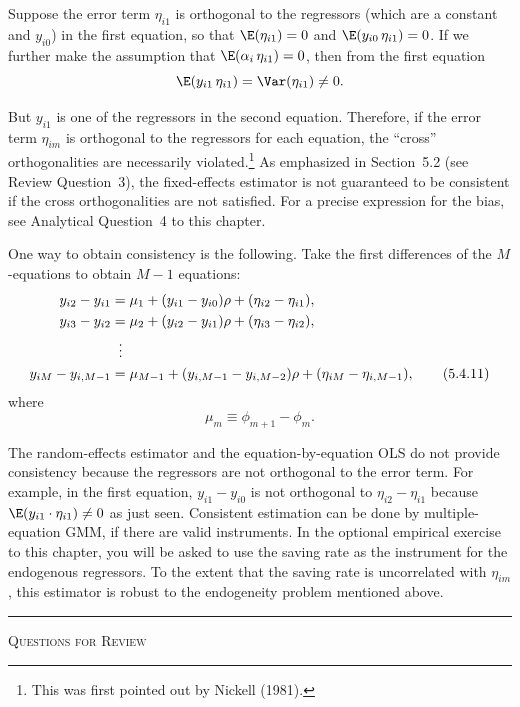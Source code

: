 Suppose the error term $\eta_{i1}$ is orthogonal to the regressors (which are a constant and
$y_{i0}$) in the first equation, so that $\E(\eta_{i1}) = 0$ and $\E(y_{i0}\,\eta_{i1}) = 0$.
If we further make
the assumption that $\E(\alpha_i\,\eta_{i1}) = 0$, then from the first equation
\[
  \E(y_{i1}\,\eta_{i1}) = \Var(\eta_{i1}) \neq 0.
\]

But $y_{i1}$ is one of the regressors in the second equation. Therefore, if the error term
$\eta_{im}$ is orthogonal to the regressors for each equation, the ``cross'' orthogonalities are
necessarily violated.\footnote{This was first pointed out by Nickell (1981).}
As emphasized in Section~5.2 (see Review Question~3), the
fixed-effects estimator is not guaranteed to be consistent if the cross orthogonalities
are not satisfied. For a precise expression for the bias, see Analytical Question~4 to
this chapter.

One way to obtain consistency is the following. Take the first differences of
the $M$-equations to obtain $M - 1$ equations:
\begin{align}
  y_{i2} - y_{i1} &= \mu_1 + (y_{i1} - y_{i0})\rho + (\eta_{i2} - \eta_{i1}),
  \notag \\
  y_{i3} - y_{i2} &= \mu_2 + (y_{i2} - y_{i1})\rho + (\eta_{i3} - \eta_{i2}),
  \notag \\
  &\;\;\vdots \notag \\
  y_{iM} - y_{i,M-1} &= \mu_{M-1} + (y_{i,M-1} - y_{i,M-2})\rho
  + (\eta_{iM} - \eta_{i,M-1}),
  \label{eq:5.4.11} \tag{5.4.11}
\end{align}
where
\[
  \mu_m \equiv \phi_{m+1} - \phi_m.
\]

The random-effects estimator and the equation-by-equation OLS do not provide
consistency because the regressors are not orthogonal to the error term. For example,
in the first equation, $y_{i1} - y_{i0}$ is not orthogonal to $\eta_{i2} - \eta_{i1}$
because $\E(y_{i1} \cdot \eta_{i1}) \neq 0$ as just seen. Consistent estimation can be done by
multiple-equation GMM, if
there are valid instruments. In the optional empirical exercise to this chapter, you
will be asked to use the saving rate as the instrument for the endogenous regressors.
To the extent that the saving rate is uncorrelated with $\eta_{im}$, this estimator is robust
to the endogeneity problem mentioned above.

\bigskip
\noindent\rule{\textwidth}{0.5pt}
\textsc{Questions for Review}
\medskip

